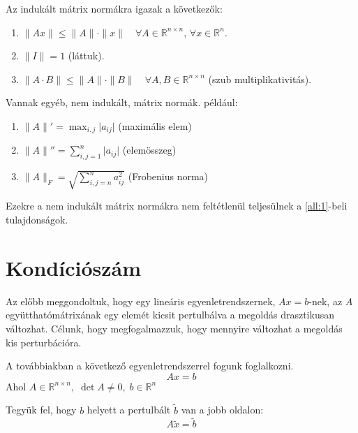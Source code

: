 \begin{allitas}\label{all:1}
    Az indukált mátrix normákra igazak a következők:
    \begin{enumerate}
        \item $\| Ax \| \leq \| A \| \cdot \| x \| \quad \forall A \in \mathbb{R}^{n \times n}$, $\forall x \in \mathbb{R}^{n}$.

        \item $\| I \| = 1$ (láttuk).

        \item $\| A \cdot B \| \leq \| A \| \cdot \| B \| \quad \forall A, B \in \mathbb{R}^{n\times n}$ (szub multiplikativitás).
    \end{enumerate}
\end{allitas}

\begin{megj}
    Vannak egyéb, nem indukált, mátrix normák. például:
    \begin{enumerate}
        \item $\| A \|' = \max_{i, j} \lvert a_{ij} \rvert$ (maximális elem)
        \item $\| A \|'' = \sum_{i, j = 1} ^{n} \lvert a_{ij} \rvert$ (elemösszeg)
        \item $\| A \|_{F} = \sqrt{ \sum_{i, j = n} ^{n} a_{ij}^{2} }$ (Frobenius norma)
    \end{enumerate}
    Ezekre a nem indukált mátrix normákra nem feltétlenül teljesülnek a \ref{all:1}-beli tulajdonságok.
\end{megj}

\section{Kondíciószám}
Az előbb meggondoltuk, hogy egy lineáris egyenletrendszernek, $Ax = b$-nek, az $A$ együtthatómátrixának egy elemét kicsit pertulbálva a megoldás drasztikusan változhat. Célunk, hogy megfogalmazzuk, hogy mennyire változhat a megoldás kis perturbációra.

A továbbiakban a következő egyenletrendszerrel fogunk foglalkozni.
\begin{equation}\label{eq:1}
    Ax = b 
\end{equation}
Ahol $A \in \mathbb{R}^{n \times n}, \; \det A \neq 0, \; b \in \mathbb{R}^{n}$

Tegyük fel, hogy  $b$ helyett a pertulbált $\tilde{b}$ van a jobb oldalon:
\begin{equation*}
    A\tilde{x} = \tilde{b}
\end{equation*}

